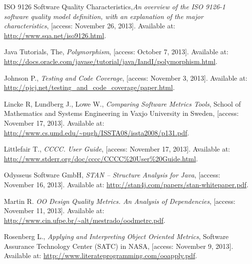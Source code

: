 \begin{thebibliography}{100}
	 ISO 9126 Software Quality Characteristics,{\em An overview of the ISO 9126-1 software quality model definition, with an explanation of the major characteristics}, [access: November 26, 2013]. Available at: \url{http://www.sqa.net/iso9126.html}.

	 Java Tutorials, The, {\em Polymorphism}, [access: October 7, 2013]. Available at: \\ \url{http://docs.oracle.com/javase/tutorial/java/IandI/polymorphism.html}.	
	
	 Johnson P., {\em Testing and Code Coverage}, [access: November 3, 2013]. Available at: \url{http://pjcj.net/testing_and_code_coverage/paper.html}.

	 Lincke R, Lundberg J., Lowe W., {\em Comparing Software Metrics Tools}, School of Mathematics and Systems Engineering in Vaxjo University in Sweden, [access: November 17, 2013]. Available at: \url{http://www.cs.umd.edu/~pugh/ISSTA08/issta2008/p131.pdf}.
 
	 Littlefair T., {\em CCCC. User Guide}, [access: November 17, 2013]. Available at: \url{http://www.stderr.org/doc/cccc/CCCC\%20User\%20Guide.html}. 

	 Odysseus Software GmbH, {\em STAN – Structure Analysis for Java}, [access: November 16, 2013]. Available at: \url{http://stan4j.com/papers/stan-whitepaper.pdf}. 
 	
	 Martin R. {\em OO Design Quality Metrics. An Analysis of Dependencies}, [access: November 11, 2013]. Available at: \url{http://www.cin.ufpe.br/~alt/mestrado/oodmetrc.pdf}.
	
	 Rosenberg L., {\em Applying and Interpreting Object Oriented Metrics}, Software Assurance Technology Center (SATC) in NASA, [access: November 9, 2013]. Available at: \url{http://www.literateprogramming.com/ooapply.pdf}.
 
\end{thebibliography}